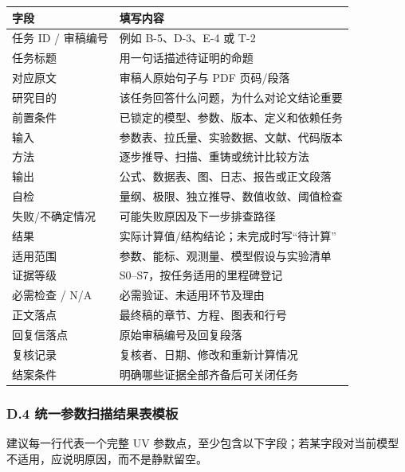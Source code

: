 \documentclass[
]{article}
\begin{document}
\begin{longtable}[]{@{}ll@{}}
\toprule\noalign{}
字段 & 填写内容 \\
\midrule\noalign{}
\endhead
\bottomrule\noalign{}
\endlastfoot
任务 ID / 审稿编号 & 例如 B-5、D-3、E-4 或 T-2 \\
任务标题 & 用一句话描述待证明的命题 \\
对应原文 & 审稿人原始句子与 PDF 页码/段落 \\
研究目的 & 该任务回答什么问题，为什么对论文结论重要 \\
前置条件 & 已锁定的模型、参数、版本、定义和依赖任务 \\
输入 & 参数表、拉氏量、实验数据、文献、代码版本 \\
方法 & 逐步推导、扫描、重铸或统计比较方法 \\
输出 & 公式、数据表、图、日志、报告或正文段落 \\
自检 & 量纲、极限、独立推导、数值收敛、阈值检查 \\
失败/不确定情况 & 可能失败原因及下一步排查路径 \\
结果 & 实际计算值/结构结论；未完成时写``待计算'' \\
适用范围 & 参数、能标、观测量、模型假设与实验清单 \\
证据等级 & S0--S7，按任务适用的里程碑登记 \\
必需检查 / N/A & 必需验证、未适用环节及理由 \\
正文落点 & 最终稿的章节、方程、图表和行号 \\
回复信落点 & 原始审稿编号及回复段落 \\
复核记录 & 复核者、日期、修改和重新计算情况 \\
结案条件 & 明确哪些证据全部齐备后可关闭任务 \\
\end{longtable}

\subsubsection{D.4
统一参数扫描结果表模板}\label{d.4-ux7edfux4e00ux53c2ux6570ux626bux63cfux7ed3ux679cux8868ux6a21ux677f}

建议每一行代表一个完整 UV
参数点，至少包含以下字段；若某字段对当前模型不适用，应说明原因，而不是静默留空。
\end{document}
